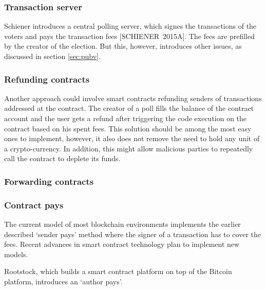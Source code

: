 \subsubsection{Transaction server}
Schiener introduces a central polling server, which signes the transactions of the voters and pays the transaction fees [SCHIENER~2015A]. The fees are prefilled by the creator of the election. But this, however, introduces other issues, as discussed in section \ref{sec:pubv}.
\subsubsection{Refunding contracts}
Another approach could involve smart contracts refunding senders of transactions addressed at the contract. The creator of a poll fills the balance of the contract account and the user gets a refund after triggering the code execution on the contract based on his spent fees. This solution should be among the most easy ones to implement, however, it also does not remove the need to hold any unit of a crypto-currency. In addition, this might allow malicious parties to repeatedly call the contract to deplete its funds. %
\subsubsection{Forwarding contracts}


\subsubsection{Contract pays}
The current model of most blockchain environments implements the earlier described \enquote*{sender pays} method where the signer of a transaction has to cover the fees. Recent advances in smart contract technology plan to implement new models.\par
Rootstock, which builds a smart contract platform on top of the Bitcoin platform, introduces an \enquote*{author pays}.

